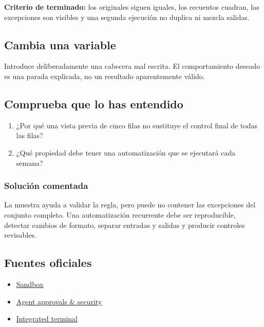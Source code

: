 \documentclass[10pt,a4paper,openany]{book}
\providecommand{\tightlist}{\setlength{\itemsep}{0.18em}\setlength{\parskip}{0pt}}
\begin{document}
\begin{successbox}

\textbf{Criterio de terminado:} los originales siguen iguales, los
recuentos cuadran, las excepciones son visibles y una segunda ejecución
no duplica ni mezcla salidas.

\end{successbox}

\subsection{Cambia una variable}\label{cambia-una-variable-11}

Introduce deliberadamente una cabecera mal escrita. El comportamiento
deseado es una parada explicada, no un resultado aparentemente válido.

\subsection{Comprueba que lo has
entendido}\label{comprueba-que-lo-has-entendido-11}

\begin{enumerate}
\def\labelenumi{\arabic{enumi}.}
\tightlist
\item
  ¿Por qué una vista previa de cinco filas no sustituye el control final
  de todas las filas?
\item
  ¿Qué propiedad debe tener una automatización que se ejecutará cada
  semana?
\end{enumerate}

\subsubsection{Solución comentada}\label{soluciuxf3n-comentada-12}

La muestra ayuda a validar la regla, pero puede no contener las
excepciones del conjunto completo. Una automatización recurrente debe
ser reproducible, detectar cambios de formato, separar entradas y
salidas y producir controles revisables.

\subsection{Fuentes oficiales}\label{fuentes-oficiales-11}

\begin{itemize}
\tightlist
\item
  \href{https://learn.chatgpt.com/docs/sandboxing}{Sandbox}
\item
  \href{https://learn.chatgpt.com/docs/agent-approvals-security}{Agent
  approvals \& security}
\item
  \href{https://learn.chatgpt.com/docs/integrated-terminal}{Integrated
  terminal}
\end{itemize}
\end{document}
